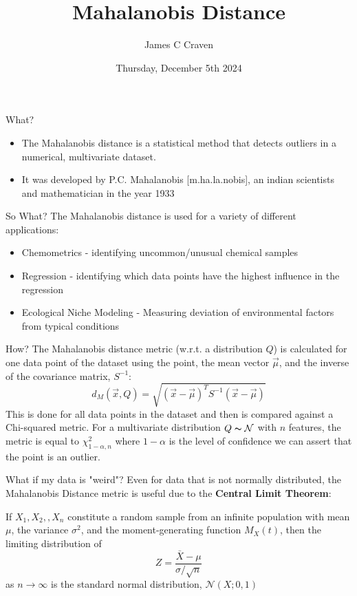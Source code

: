 \documentclass[9pt, dvipsnames]{beamer}
\title{Mahalanobis Distance}
\author{James C Craven}
\date{Thursday, December 5th 2024}
\begin{document}
\maketitle

\begin{frame}{What?}
    \begin{itemize}
        \item The Mahalanobis distance is a statistical method that detects outliers in a numerical, multivariate
            dataset.
        \item It was developed by P.C. Mahalanobis [m\textipa{\ae}.ha.la.nobis], an indian scientists
            and mathematician in the year 1933
    \end{itemize}
\end{frame}

\begin{frame}{So What?}
    The Mahalanobis distance is used for a variety of different applications:
    \begin{itemize}
        \item Chemometrics - identifying uncommon/unusual chemical samples
        \item Regression - identifying which data points have the highest influence in the regression
        \item Ecological Niche Modeling - Measuring deviation of environmental factors from typical conditions
    \end{itemize}
\end{frame}

\begin{frame}{How?}
    The Mahalanobis distance metric (w.r.t. a distribution $Q$) is calculated for one data point of the dataset
    using the point, the mean vector $\vec{\mu}$, and the inverse of the covariance matrix, $S^{-1}$:
    \[
        d_M(\vec{x}, Q) = \sqrt{(\vec{x} - \vec{\mu})^TS^{-1}(\vec{x}-\vec{\mu})}
    \]
    This is done for all data points in the dataset and then is compared against a Chi-squared metric. For a multivariate
    distribution $Q\thicksim\mathcal{N}$ with $n$ features, the metric is equal to $\chi^2_{1-\alpha,n}$ where $1 - \alpha$
    is the level of confidence we can assert that the point is an outlier.
\end{frame}

\begin{frame}{What if my data is "weird"?}
    Even for data that is not normally distributed, the Mahalanobis Distance metric is useful due to the
    \textbf{Central Limit Theorem}:
    \begin{theorem}
        If $X_1,X_2,$\textellipsis$,X_n$ constitute a random sample from an infinite population with mean $\mu$,
        the variance $\sigma^2$, and the moment-generating function $M_X(t)$, then the limiting distribution of
        \[
            Z = \frac{\bar{X}-\mu}{\sigma/\sqrt{n}}
        \]
        as $n \to \infty$ is the standard normal distribution, $\mathcal{N}(X;0,1)$
    \end{theorem}
\end{frame}
\end{document}
